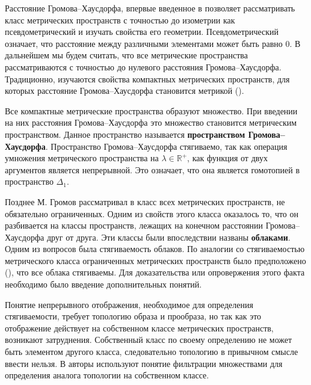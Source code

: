 Расстояние Громова--Хаусдорфа, впервые введенное в \cite{Edwards} позволяет
рассматривать класс метрических пространств с точностью до изометрии как
псевдометрический и изучать свойства его геометрии. Псевдометрический означает,
что расстояние между различными элементами может быть равно \( 0 \). В
дальнейшем мы будем считать, что все метрические пространства рассматриваются с
точностью до нулевого расстояния Громова--Хаусдорфа. Традиционно, изучаются
свойства компактных метрических пространств, для которых расстояние
Громова--Хаусдорфа становится метрикой (\cite{gromov_structures_1981}).

Все компактные метрические пространства образуют множество. При введении на них
расстояния Громова--Хаусдорфа это множество становится метрическим
пространством. Данное пространство называется \textbf{пространством
Громова--Хаусдорфа}. Пространство Громова--Хаусдорфа стягиваемо, так как
операция умножения метрического пространства на \( \lambda \in \mathbb{R}^+\),
как функция от двух аргументов является непрерывной. Это означает, что она
является гомотопией в пространство \( \Delta _1 \).

Позднее М. Громов рассматривал в \cite{gromov_metric_2001} класс всех
метрических пространств, не обязательно ограниченных. Одним из свойств этого
класса оказалось то, что он разбивается на классы пространств, лежащих на
конечном расстоянии Громова--Хаусдорфа друг от друга. Эти классы были
впоследствии названы \textbf{облаками}. Одним из вопросов была стягиваемость
облаков. По аналогии со стягиваемостью метрического класса ограниченных
метрических пространств было предположено (\cite{gromov_structures_1981}), что
все облака стягиваемы. Для доказательства или опровержения этого факта
необходимо было введение дополнительных понятий.

Понятие непрерывного отображения, необходимое для определения стягиваемости,
требует топологию образа и прообраза, но так как это отображение действует на
собственном классе метрических пространств, возникают затруднения. Собственный
класс по своему определению не может быть элементом другого класса,
следовательно топологию в привычном смысле ввести нельзя. В
\cite{borzov_extendability_2020} авторы используют понятие фильтрации
множествами для определения аналога топологии на собственном классе.

